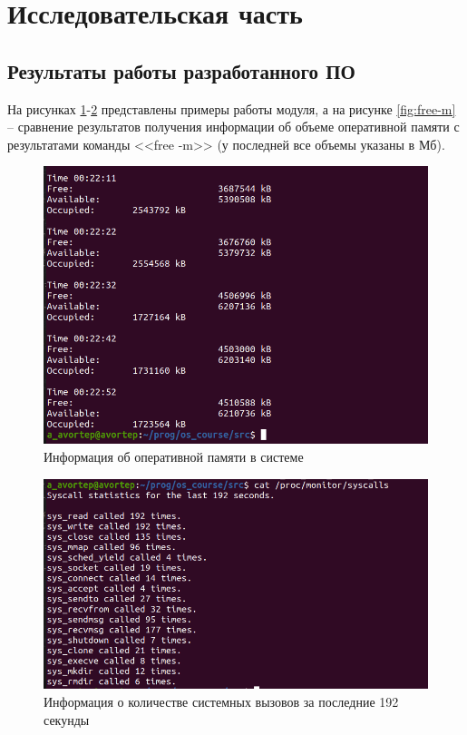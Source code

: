 \section{Исследовательская часть}

\subsection{Результаты работы разработанного ПО}

На рисунках \ref{fig:example_mem}-\ref{fig:example_syscalls} представлены примеры работы модуля, а на рисунке \ref{fig:free-m} -- сравнение результатов получения информации об объеме оперативной памяти с результатами команды <<free -m>> (у последней все объемы указаны в Мб).

\begin{figure}[h!]
	\begin{center}
		\includegraphics[scale=0.4]{jpg/2.png}
	\end{center}
	\captionsetup{justification=centering}
	\caption{Информация об оперативной памяти в системе}
	\label{fig:example_mem}
\end{figure}

\begin{figure}[h!]
	\begin{center}
		\includegraphics[scale=0.4]{jpg/cat_syscalls.png}
	\end{center}
	\captionsetup{justification=centering}
	\caption{Информация о количестве системных вызовов за последние 192 секунды}
	\label{fig:example_syscalls}
\end{figure}

